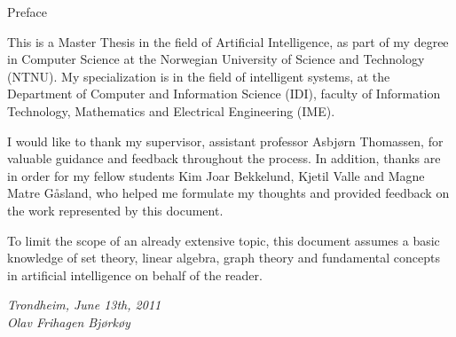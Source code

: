 \null\vspace{5em}
{
  \centering
  \normalfont
  \huge
  Preface\\
}
\vspace{2em}

This is a Master Thesis in the field of Artificial Intelligence,
as part of my degree in Computer Science
at the Norwegian University of Science and Technology (NTNU).
My specialization is in the field of intelligent systems, 
at the Department of Computer and Information Science (IDI), 
faculty of Information Technology, Mathematics and Electrical Engineering (IME).

I would like to thank my supervisor, assistant professor Asbjørn Thomassen, for valuable guidance and feedback throughout the process.
In addition, thanks are in order for my fellow students 
Kim Joar Bekkelund, Kjetil Valle and Magne Matre Gåsland,
who helped me formulate my thoughts and provided feedback on the work represented by this document.

To limit the scope of an already extensive topic, this document assumes a basic knowledge of set theory, 
linear algebra, graph theory and fundamental concepts in artificial intelligence on behalf of the reader.

\vspace{2em}
\begin{center}
  \color{red}
  \itshape
  Trondheim, June 13th, 2011\\
  Olav Frihagen Bjørkøy\\
\end{center}

\clearpage

